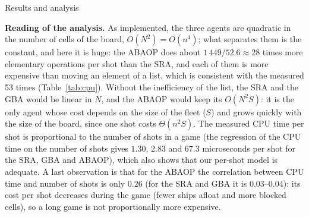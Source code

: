 \documentclass[letterpaper,11pt]{article} %
\renewcommand{\arraystretch}{1.8}
\begin{document}
\begin{Resultados}{Results and analysis}
\begin{table}[H]
    \centering
    \small
    \renewcommand{\arraystretch}{1.5}
    \caption{Complexity of the three agents in terms of the number of cells $N$ and the total length of the fleet $S$, and the counts and times measured in the experiments.}
    \label{tab:complexity}
\end{table}

\textbf{Reading of the analysis.} As implemented, the three agents are quadratic in the number of cells of the board, $O(N^2)=O(n^4)$; what separates them is the constant, and here it is huge: the ABAOP does about $1\,449/52.6\approx28$ times more elementary operations per shot than the SRA, and each of them is more expensive than moving an element of a list, which is consistent with the measured 53 times (Table~\ref{tab:cpu}). Without the inefficiency of the list, the SRA and the GBA would be linear in $N$, and the ABAOP would keep its $O(N^2S)$: it is the only agent whose cost depends on the size of the fleet ($S$) and grows quickly with the size of the board, since one shot costs $\Theta(n^2S)$. The measured CPU time per shot is proportional to the number of shots in a game (the regression of the CPU time on the number of shots gives $1.30$, $2.83$ and $67.3$ microseconds per shot for the SRA, GBA and ABAOP), which also shows that our per-shot model is adequate. A last observation is that for the ABAOP the correlation between CPU time and number of shots is only $0.26$ (for the SRA and GBA it is $0.03$--$0.04$): its cost per shot decreases during the game (fewer ships afloat and more blocked cells), so a long game is not proportionally more expensive.

\end{Resultados}
\end{document}
